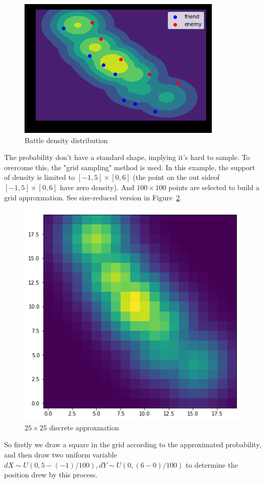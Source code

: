 \documentclass{article}
\begin{document}
\begin{figure}[h!]
\includegraphics{state_no_battle_prob.png}
\caption{Battle density distribution}
\label{fig:stateNoBattleProb}
\end{figure}

The probability don't have a standard shape, implying it's hard to sample. To overcome this, the "grid 
sampling" method is used. In this example, the support of density is limited to $[-1,5] \times [0,6]$
(the point on the out sideof $[-1,5] \times [0,6]$ have zero density). And $100 \times 100$ points are 
selected to build a grid approxmation. See size-reduced version in Figure~\ref{fig:gridify}.

\begin{figure}[h!]
\includegraphics[width=0.6\linewidth]{gridify.png}
\caption{$25 \times 25$ discrete approxmation}
\label{fig:gridify}
\end{figure}

So firstly we draw a square in the grid according to the approximated probability, 
and then draw two uniform variable $dX \sim U(0,5-(-1)/100),dY \sim U(0,(6-0)/100)$ 
to determine the position drew by this process.
\end{document}
